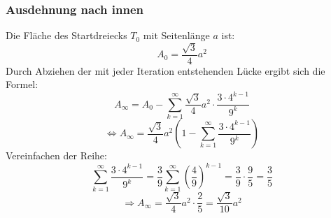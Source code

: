         \subsubsection{Ausdehnung nach innen}
            Die Fläche des Startdreiecks \( T_0 \) mit Seitenlänge \( a \) ist:
            \[
            A_0 = \frac{\sqrt{3}}{4} a^2
            \]
            Durch Abziehen der mit jeder Iteration entstehenden Lücke ergibt sich die Formel:
            \[
            A_\infty = A_0 - \sum_{k=1}^\infty \frac{\sqrt{3}}{4} a^2 \cdot \frac{3 \cdot 4^{k-1}}{9^k}
            \]
            \[
            \Leftrightarrow A_\infty = \frac{\sqrt{3}}{4} a^2 \left(1 - \sum_{k=1}^\infty \frac{3 \cdot 4^{k-1}}{9^k}\right)
            \]
            Vereinfachen der Reihe:
            \[
            \sum_{k=1}^\infty \frac{3 \cdot 4^{k-1}}{9^k} = \frac{3}{9} \sum_{k=1}^\infty \left(\frac{4}{9}\right)^{k-1} = \frac{3}{9} \cdot \frac{9}{5} = \frac{3}{5}
            \]
            \[
            \Rightarrow A_\infty = \frac{\sqrt{3}}{4} a^2 \cdot \frac{2}{5} = \frac{\sqrt{3}}{10} a^2
            \]
        